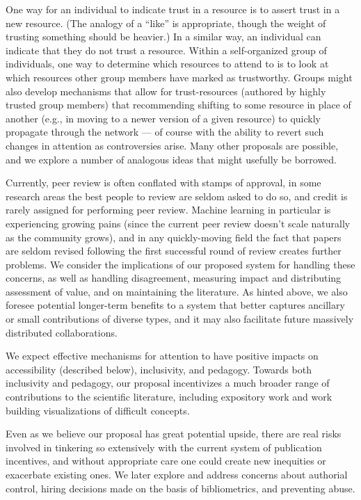\documentclass{article} %
\begin{document}
One way for an individual to indicate trust in a resource is to assert trust in a new resource. (The analogy of a ``like'' is appropriate, though the 
weight of trusting something should be heavier.) In a similar way, an individual can indicate that they do not trust a resource.
Within a self-organized group of individuals,
one way to determine which resources to attend to
is to look at which resources other group members have marked as trustworthy. 
Groups might also develop mechanisms that
allow for trust-resources 
(authored by highly trusted group members) 
that recommending shifting to some resource in place of another (e.g., in moving to a newer version of a given resource) to quickly propagate through the network --- of course with the ability to revert such changes in attention as controversies arise. Many other proposals are possible, and we explore a number of analogous ideas that might usefully be borrowed.

Currently, peer review is often conflated with stamps of approval,
in some research areas the best people to review are seldom asked to do so,
and credit is rarely assigned for performing peer review.
Machine learning in particular is experiencing growing pains 
(since the current peer review doesn't scale naturally as the community grows), 
and in any quickly-moving field the fact that papers are seldom revised 
following the first successful round of review creates further problems.
We consider the implications of our proposed system for handling these concerns,
as well as handling disagreement, measuring impact and distributing assessment of value, 
and on maintaining the literature.
As hinted above, we also foresee potential longer-term benefits to a system
that better captures ancillary or small contributions of diverse types,
and it may also facilitate future massively distributed collaborations.


We expect effective mechanisms for attention to have positive impacts on accessibility (described below), inclusivity, and
pedagogy.
Towards both inclusivity and pedagogy, our proposal incentivizes a much broader range of contributions 
to the scientific literature, including expository work and work building visualizations of difficult concepts.

Even as we believe our proposal has great potential upside, there are real risks involved in tinkering 
so extensively with the current system of publication incentives,
and without appropriate care one could create new inequities or exacerbate existing ones. 
We later explore and address concerns about authorial control,
hiring decisions made on the basis of bibliometrics, and preventing abuse.
\end{document}
